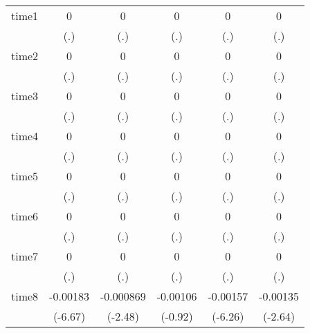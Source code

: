 \begin{table}[htbp]
\begin{tabular}{l*{5}{c}}
time1       &           0         &           0         &           0         &           0         &           0         \\
            &         (.)         &         (.)         &         (.)         &         (.)         &         (.)         \\
time2       &           0         &           0         &           0         &           0         &           0         \\
            &         (.)         &         (.)         &         (.)         &         (.)         &         (.)         \\
time3       &           0         &           0         &           0         &           0         &           0         \\
            &         (.)         &         (.)         &         (.)         &         (.)         &         (.)         \\
time4       &           0         &           0         &           0         &           0         &           0         \\
            &         (.)         &         (.)         &         (.)         &         (.)         &         (.)         \\
time5       &           0         &           0         &           0         &           0         &           0         \\
            &         (.)         &         (.)         &         (.)         &         (.)         &         (.)         \\
time6       &           0         &           0         &           0         &           0         &           0         \\
            &         (.)         &         (.)         &         (.)         &         (.)         &         (.)         \\
time7       &           0         &           0         &           0         &           0         &           0         \\
            &         (.)         &         (.)         &         (.)         &         (.)         &         (.)         \\
time8       &    -0.00183\sym{***}&   -0.000869\sym{*}  &    -0.00106         &    -0.00157\sym{***}&    -0.00135\sym{**} \\
            &     (-6.67)         &     (-2.48)         &     (-0.92)         &     (-6.26)         &     (-2.64)         \\

\end{tabular}
\end{table}
